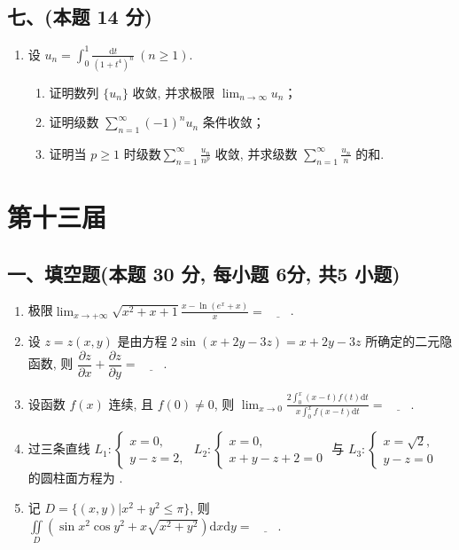 \subsection*{七、(本题 14 分)}
\begin{enumerate}[start=11]
    \item 设 $u_n = \displaystyle\int_{0}^{1} \frac{\mathrm{d}t}{(1+t^4)^n} \ (n \geqslant 1)$.
          \begin{enumerate}
              \item[(1)] 证明数列 $\{u_n\}$ 收敛, 并求极限 $\displaystyle\lim_{n \to \infty} u_n$；
              \item[(2)] 证明级数 $\displaystyle\sum_{n=1}^{\infty} (-1)^n u_n$ 条件收敛；
              \item[(3)] 证明当 $p \geqslant 1$ 时级数$\displaystyle\sum_{n=1}^{\infty} \frac{u_n}{n^p}$ 收敛, 并求级数 $\displaystyle\sum_{n=1}^{\infty} \frac{u_n}{n}$ 的和.
          \end{enumerate}
\end{enumerate}


\newpage
\section{第十三届}

\subsection*{一、填空题(本题 30 分,  每小题 6分,  共5 小题)}
\begin{enumerate}
    \item 极限$\displaystyle\lim_{x \to +\infty} \sqrt{x^2 + x + 1} \frac{x - \ln(e^x + x)}{x} = \underline{\quad \quad} $.
    \item 设 $z = z(x,  y)$ 是由方程 $2 \sin(x + 2y - 3z) = x + 2y - 3z$ 所确定的二元隐函数, 则 $ \dfrac{\partial z}{\partial x} + \dfrac{\partial z}{\partial y} = \underline{\quad \quad} $.
    \item 设函数 $f(x)$ 连续, 且 $f(0) \neq 0$, 则 $ \displaystyle\lim_{x \to 0} \frac{2 \displaystyle\int_0^x (x - t) f(t) \mathrm{d}t}{x \displaystyle\int_0^x f(x - t) \mathrm{d}t} = \underline{\quad \quad} $.
    \item 过三条直线 $L_1 : \begin{cases} x = 0,  \\ y - z = 2,  \end{cases}$ $L_2 : \begin{cases} x = 0,  \\ x + y - z + 2 = 0 \end{cases}$ 与 $L_3 : \begin{cases} x = \sqrt{2},  \\ y - z = 0 \end{cases}$ 的圆柱面方程为 \underline{\quad \quad}.
    \item 记 $D = \{(x,  y) | x^2 + y^2 \leq \pi \}$, 则 $ \displaystyle\iint\limits_D \left( \sin x^2 \cos y^2 + x \sqrt{x^2 + y^2} \right) \mathrm{d}x\mathrm{d}y = \underline{\quad \quad} $.
\end{enumerate}

